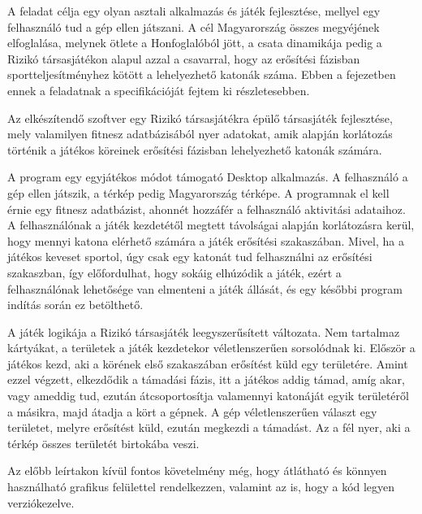A feladat célja egy olyan asztali alkalmazás és játék fejlesztése, mellyel egy felhasználó tud a gép ellen játszani. A cél Magyarország összes megyéjének elfoglalása, melynek ötlete a Honfoglalóból jött, a csata dinamikája pedig a Rizikó társasjátékon alapul azzal a csavarral, hogy az erősítési fázisban sportteljesítményhez kötött a lehelyezhető katonák száma. Ebben a fejezetben ennek a feladatnak a specifikációját fejtem ki részletesebben. 

Az elkészítendő szoftver egy Rizikó társasjátékra épülő társasjáték fejlesztése, mely valamilyen fitnesz adatbázisából nyer adatokat, amik alapján korlátozás történik a játékos köreinek erősítési fázisban lehelyezhető katonák számára. 

A program egy egyjátékos módot támogató Desktop alkalmazás. A felhasználó a gép ellen játszik, a térkép pedig Magyarország térképe. A programnak el kell érnie egy fitnesz adatbázist, ahonnét hozzáfér a felhasználó aktivitási adataihoz. A felhasználónak a játék kezdetétől megtett távolságai alapján korlátozásra kerül, hogy mennyi katona elérhető számára a játék erősítési szakaszában. Mivel, ha a játékos keveset sportol, úgy csak egy katonát tud felhasználni az erősítési szakaszban, így előfordulhat, hogy sokáig elhúzódik a játék, ezért a felhasználónak lehetősége van elmenteni a játék állását, és egy későbbi program indítás során ez betölthető. 

A játék logikája a Rizikó társasjáték leegyszerűsített változata. Nem tartalmaz kártyákat, a területek a játék kezdetekor véletlenszerűen sorsolódnak ki. Először a játékos kezd, aki a körének első szakaszában erősítést küld egy területére. Amint ezzel végzett, elkezdődik a támadási fázis, itt a játékos addig támad, amíg akar, vagy ameddig tud, ezután átcsoportosítja valamennyi katonáját egyik területéről a másikra, majd átadja a kört a gépnek. A gép véletlenszerűen választ egy területet, melyre erősítést küld, ezután megkezdi a támadást. Az a fél nyer, aki a térkép összes területét birtokába veszi. 

Az előbb leírtakon kívül fontos követelmény még, hogy átlátható és könnyen használható grafikus felülettel rendelkezzen, valamint az is, hogy a kód legyen verziókezelve. 